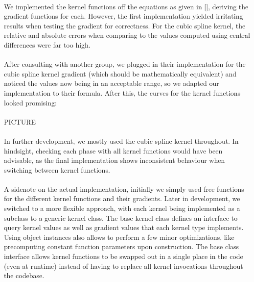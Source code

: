 \documentclass{ACGSeminar}
\begin{document}
\\
We implemented the kernel functions off the equations as given in [\cite{Liu}], deriving the gradient functions for each. However, the first implementation yielded irritating results when testing the gradient for correctness. For the cubic spline kernel, the relative and absolute errors when comparing to the values computed using central differences were far too high. \\
\\
After consulting with another group, we plugged in their implementation for the cubic spline kernel gradient (which should be mathematically equivalent) and noticed the values now being in an acceptable range, so we adapted our implementation to their formula. After this, the curves for the kernel functions looked promising:\\
\\
PICTURE\\
\\
In further development, we mostly used the cubic spline kernel throughout. In hindsight, checking each phase with all kernel functions would have been advisable, as the final implementation shows inconsistent behaviour when switching between kernel functions.\\
\\
A sidenote on the actual implementation, initially we simply used free functions for the different kernel functions and their gradients. Later in development, we switched to a more flexible approach, with each kernel being implemented as a subclass to a generic kernel class. The base kernel class defines an interface to query kernel values as well as gradient values that each kernel type implements. Using object instances also allows to perform a few minor optimizations, like precomputing constant function parameters upon construction. The base class interface allows kernel functions to be swapped out in a single place in the code (even at runtime) instead of having to replace all kernel invocations throughout the codebase.\\
\\
\end{document}
